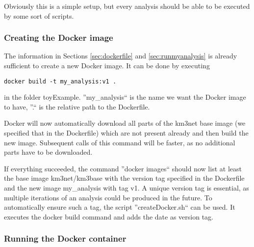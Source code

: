 \documentclass[a4paper, twoside, 11pt]{article}
\begin{document}
Obviously this is a simple setup, but every analysis should be able to be executed by some sort of scripts. 

\subsubsection{Creating the Docker image}
\label{sec:createImage}
The information in Sections \ref{sec:dockerfile} and \ref{sec:runmyanalysis} 
is already sufficient to create a new Docker image. 
It can be done by executing
\begin{lstlisting}[basicstyle=\ttfamily\small,upquote=true,columns=flexible,keepspaces=true,frame=single]
docker build -t my_analysis:v1 .
\end{lstlisting}
in the folder toyExample. 
''my\_analysis`` is the name we want the Docker image to have, 
''.`` is the relative path to the Dockerfile.

Docker will now automatically download all parts of the km3net base image 
(we specified that in the Dockerfile)
which are not present already and then build the new image. 
Subsequent calls of this command will be faster, as no additional parts have to be downloaded. 

If everything succeeded, the command ''docker images`` 
should now list at least the base image km3net/km3base 
with the version tag specified in the Dockerfile and 
the new image my\_analysis with tag v1. 
A unique version tag is essential, as multiple iterations of an analysis could be produced in the future. 
To automatically ensure such a tag, the script ''createDocker.sh`` can be used.
It executes the docker build command and adds the date as version tag. 


\subsubsection{Running the Docker container}
\label{sec:runContainer}
\end{document}
